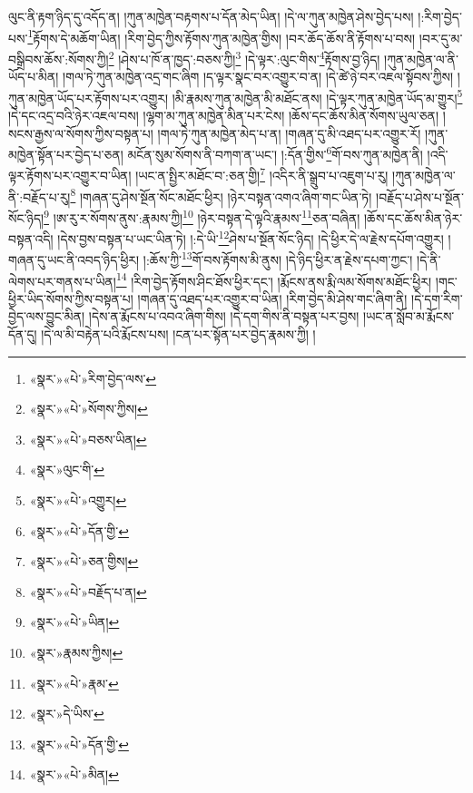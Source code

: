 ལུང་ནི་རྟག་ཉིད་དུ་འདོད་ན། །ཀུན་མཁྱེན་བརྟགས་པ་དོན་མེད་ཡིན། །དེ་ལ་ཀུན་མཁྱེན་ཤེས་བྱེད་པས། །:རིག་བྱེད་པས་\footnote{«སྣར་»«པེ་»རིག་བྱེད་ལས་}རྟོགས་དེ་མཆོག་ཡིན། །རིག་བྱེད་ཀྱིས་རྟོགས་ཀུན་མཁྱེན་གྱིས། །བར་ཆོད་ཆོས་ནི་རྟོགས་པ་བས། །བར་དུ་མ་བསྒྲིབས་ཆོས་:སོགས་ཀྱི།\footnote{«སྣར་»«པེ་»སོགས་ཀྱིས།} །ཤེས་པ་ཁོ་ན་ཁྱད་:བཅས་ཀྱི།\footnote{«སྣར་»«པེ་»བཅས་ཡིན།} །དེ་ལྟར་:ལུང་གིས་\footnote{«སྣར་»ལུང་གི་}རྟོགས་བྱ་ཉིད། །ཀུན་མཁྱེན་ལ་ནི་ཡོད་པ་མིན། །གལ་ཏེ་ཀུན་མཁྱེན་འདྲ་གང་ཞིག །ད་ལྟར་སྣང་བར་འགྱུར་བ་ན། །དེ་ཚེ་ཉེ་བར་འཇལ་སྟོབས་ཀྱིས། །ཀུན་མཁྱེན་ཡོད་པར་རྟོགས་པར་འགྱུར། །མི་རྣམས་ཀུན་མཁྱེན་མི་མཐོང་ནས། །དེ་ལྟར་ཀུན་མཁྱེན་ཡོད་མ་གྱུར།\footnote{«སྣར་»«པེ་»འགྱུར།} །དེ་དང་འདྲ་བའི་ཉེར་འཇལ་བས། །ལྷག་མ་ཀུན་མཁྱེན་མིན་པར་ངེས། །ཆོས་དང་ཆོས་མིན་སོགས་ཡུལ་ཅན། །སངས་རྒྱས་ལ་སོགས་ཀྱིས་བསྟན་པ། །གལ་ཏེ་ཀུན་མཁྱེན་མེད་པ་ན། །གཞན་དུ་མི་འཐད་པར་འགྱུར་རོ། །ཀུན་མཁྱེན་སྟོན་པར་བྱེད་པ་ཅན། མངོན་སུམ་སོགས་ནི་བཀག་ན་ཡང་། །:དོན་གྱིས་\footnote{«སྣར་»«པེ་»དོན་གྱི་}གོ་བས་ཀུན་མཁྱེན་ནི། །འདི་ལྟར་རྟོགས་པར་འགྱུར་བ་ཡིན། །ཡང་ན་སྤྱིར་མཐོང་བ་:ཅན་གྱི།\footnote{«སྣར་»«པེ་»ཅན་གྱིས།} །འདིར་ནི་སྒྲུབ་པ་འཇུག་པ་རུ། །ཀུན་མཁྱེན་ལ་ནི་:བརྗོད་པ་རུ།\footnote{«སྣར་»«པེ་»བརྗོད་པ་ན།} །གཞན་དུ་ཤེས་སྔོན་སོང་མཐོང་ཕྱིར། །ཉེར་བསྟན་འགའ་ཞིག་གང་ཡིན་ཏེ། །བརྗོད་པ་ཤེས་པ་སྔོན་སོང་ཉིད།\footnote{«སྣར་»«པེ་»ཡིན།} །ཨ་རུ་ར་སོགས་ནུས་:རྣམས་ཀྱི།\footnote{«སྣར་»རྣམས་ཀྱིས།} །ཉེར་བསྟན་དེ་ལྟའི་རྣམས་\footnote{«སྣར་»«པེ་»རྣམ་}ཅན་བཞིན། །ཆོས་དང་ཆོས་མིན་ཉེར་བསྟན་འདི། །དེས་བྱས་བསྟན་པ་ཡང་ཡིན་ཏེ། །:དེ་ཡི་\footnote{«སྣར་»དེ་ཡིས་}ཤེས་པ་སྔོན་སོང་ཉིད། །དེ་ཕྱིར་དེ་ལ་རྗེས་དཔོག་འགྱུར། །གཞན་དུ་ཡང་ནི་འབད་ཉིད་ཕྱིར། །:ཆོས་ཀྱི་\footnote{«སྣར་»«པེ་»དོན་གྱི་}གོ་བས་རྟོགས་མི་ནུས། །དེ་ཉིད་ཕྱིར་ན་རྗེས་དཔག་ཀྱང་། །དེ་ནི་ལེགས་པར་གནས་པ་ཡིན།\footnote{«སྣར་»«པེ་»མིན།} །རིག་བྱེད་རྟོགས་ཤིང་ཐོས་ཕྱིར་དང་། །རྨོངས་ནས་རྨི་ལམ་སོགས་མཐོང་ཕྱིར། །གང་ཕྱིར་ཡིད་སོགས་ཀྱིས་བསྟན་པ། །གཞན་དུ་འཐད་པར་འགྱུར་བ་ཡིན། །རིག་བྱེད་མི་ཤེས་གང་ཞིག་ནི། །དེ་དག་རིག་བྱེད་ལས་བྱུང་མིན། །དེས་ན་རྨོངས་པ་འབའ་ཞིག་གིས། །དེ་དག་གིས་ནི་བསྟན་པར་བྱས། །ཡང་ན་སློབ་མ་རྨོངས་དོན་དུ། །དེ་ལ་མི་བརྟེན་པའི་རྨོངས་པས། །ངན་པར་སྟོན་པར་བྱེད་རྣམས་ཀྱི། །
